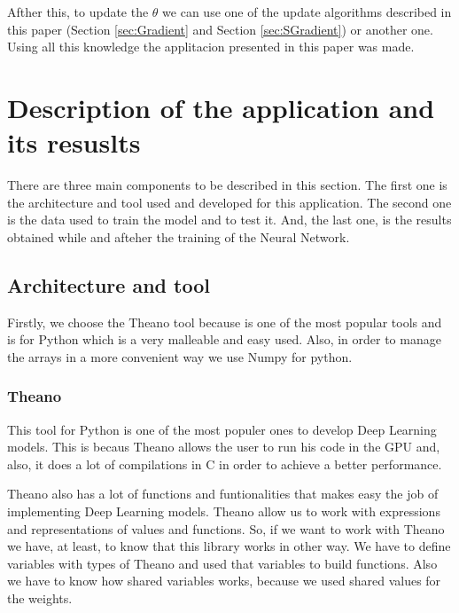 \documentclass[12pt]{article}
\begin{document}
Afther this, to update the $\theta$ we can use one of the update algorithms described in this paper (Section \ref{sec:Gradient} and Section \ref{sec:SGradient}) or another one. Using all this knowledge the applitacion presented in this paper was made.
\section{Description of the application and its resuslts}

There are three main components to be described in this section. The first one is the architecture and tool used and developed for this application. The second one is the data used to train the model and to test it. And, the last one, is the results obtained while and afteher the training of the Neural Network.


\subsection{Architecture and tool}

Firstly, we choose the Theano tool because is one of the most popular tools and is for Python which is a very malleable and easy used. Also, in order to manage the arrays in a more convenient way we use Numpy for python.

\subsubsection{Theano\cite{2016arXiv160502688short}}
This tool for Python is one of the most populer ones to develop Deep Learning models. This is becaus Theano allows the user to run his code in the GPU and, also, it does a lot of compilations in C in order to achieve a better performance.

Theano also has a lot of functions and funtionalities that makes easy the job of implementing Deep Learning models. Theano allow us to work with expressions and representations of values and functions. So, if we want to work with Theano we have, at least, to know that this library works in other way. We have to define variables with types of Theano and used that variables to build functions. Also we have to know how shared variables works, because we used shared values for the weights.
\end{document}
